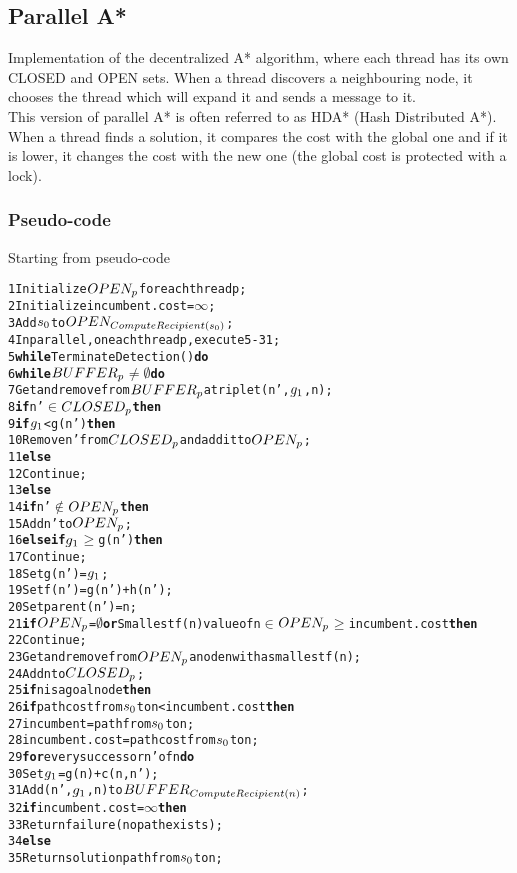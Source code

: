 \subsection{Parallel A*}

Implementation of the decentralized A* algorithm, where each thread has its own CLOSED and OPEN sets.
When a thread discovers a neighbouring node, it chooses the thread which will expand it and sends a message to it.
\\
This version of parallel A* is often referred to as HDA* (Hash Distributed A*).
\\
When a thread finds a solution, it compares the cost with the global one and if it is lower, it changes the cost with the new one (the global cost is protected with a lock).

\subsubsection{Pseudo-code}

Starting from pseudo-code \cite{bibParAstar}

\begin{alltt}
    1 Initialize \(OPEN\sb{p}\) for each thread p;
    2 Initialize incumbent.cost = \(\infty\);
    3 Add \(s\sb{0}\) to \(OPEN\sb{ComputeRecipient(s\sb{0})}\);
    4 In parallel, on each thread p, execute 5-31;
    5 {\bf while} TerminateDetection() {\bf do}
    6    {\bf while} \(BUFFER\sb{p}\) \(\neq\) \(\emptyset\) {\bf do}
    7       Get and remove from \(BUFFER\sb{p}\) a triplet (n', \(g\sb{1}\), n);
    8       {\bf if} n' \(\in\) \(CLOSED\sb{p}\) {\bf then}
    9           {\bf if} \(g\sb{1}\) < g(n') {\bf then}
    10              Remove n' from \(CLOSED\sb{p}\) and add it to \(OPEN\sb{p}\);
    11          {\bf else}
    12              Continue;
    13      {\bf else}
    14          {\bf if} n' \(\notin\) \(OPEN\sb{p}\) {\bf then}
    15              Add n' to \(OPEN\sb{p}\);
    16          {\bf else if} \(g\sb{1}\) \(\geq\) g(n') {\bf then}
    17              Continue;
    18      Set g(n') = \(g\sb{1}\);
    19      Set f(n') = g(n') + h(n');
    20      Set parent(n') = n;
    21   {\bf if} \(OPEN\sb{p}\) = \(\emptyset\) {\bf or} Smallest f(n) value of n \(\in\) \(OPEN\sb{p}\) \(\geq\) incumbent.cost {\bf then}
    22      Continue;
    23   Get and remove from \(OPEN\sb{p}\) a node n with a smallest f(n);
    24   Add n to \(CLOSED\sb{p}\);
    25   {\bf if} n is a goal node {\bf then}
    26      {\bf if} path cost from \(s\sb{0}\) to n < incumbent.cost {\bf then}
    27          incumbent = path from \(s\sb{0}\) to n;
    28          incumbent.cost = path cost from \(s\sb{0}\) to n;
    29   {\bf for} every successor n' of n {\bf do}
    30      Set \(g\sb{1}\) = g(n) + c(n , n');
    31      Add (n', \(g\sb{1}\), n) to \(BUFFER\sb{ComputeRecipient(n)}\);
    32 {\bf if} incumbent.cost = \(\infty\) {\bf then}
    33    Return failure (no path exists);
    34 {\bf else}
    35    Return solution path from \(s\sb{0}\) to n;
\end{alltt}


